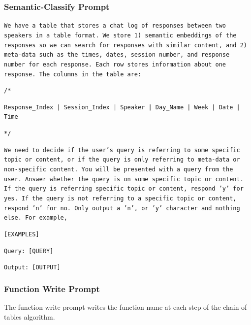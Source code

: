 \documentclass{article}
\begin{document}
\subsubsection{Semantic-Classify Prompt}
\colorbox{prompt_gray}{\begin{minipage}{.98\textwidth}
\texttt{We have a table that stores a chat log of responses between two speakers in a table format. We store 1) semantic embeddings of the responses so we can search for responses with similar content, and 2) meta-data such as  the times, dates, session number, and response number for each response. Each row stores information about one response. The columns in the table are:}
\newline

\texttt{/*}

\texttt{Response\_Index | Session\_Index | Speaker | Day\_Name | Week | Date | Time}

\texttt{*/}
\newline

\texttt{We need to decide if the user's query is referring to some specific topic or content, or if the query is only referring to meta-data or non-specific content. You will be presented with a query from the user. Answer whether the query is on some specific topic or content. If the query is referring specific topic or content, respond 'y' for yes. If the query is not referring to a specific topic or content, respond 'n' for no. Only output a 'n', or 'y' character and nothing else. For example,}
\newline

\texttt{[EXAMPLES]}
\newline

\texttt{Query: [QUERY]}

\texttt{Output: [OUTPUT]}
\end{minipage}}



\newpage
\subsubsection{Function Write Prompt}
The function write prompt writes the function name at each step of the chain of tables algorithm.
\end{document}
